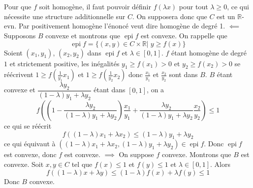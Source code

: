 \documentclass{report}
\DeclareMathOperator{\epi}{epi}
\begin{document}
\subsection{} \noindent{}\\ 
\\ 
\\
\noindent Pour que $f$ soit homogène, il faut pouvoir définir $f(\lambda x)$ pour tout $\lambda \geq 0$, ce qui nécessite une structure additionnelle sur $C$. On supposera donc que $C$ est un $\mathbb R$-evn. Par positivement homogène l'énoncé veut dire homogène de degré 1.\newline \newline
$\impliedby$ Supposons $B$ convexe et montrons que $\epi f$ est convexe. On rappelle que $$\epi f= \{(x,y)\in C\times \mathbb R|\;y\geq f(x)\}$$
Soient $(x_1,y_1)$, $(x_2,y_2)$ dans $\epi f$ et $\lambda \in [0,1]$. $f$ étant homogène de degré $1$ et strictement positive, les inégalités $y_1\geq f(x_1)>0$ et $y_2\geq f(x_2)>0$ se réécrivent $1\geq f(\frac{1}{y_1}x_1)$ et $1\geq f(\frac{1}{y_2}x_2)$ donc $\frac{x_1}{y_1}$ et $\frac{x_2}{y_2}$ sont dans $B$.\newline \newline 
$B$ étant convexe et $\dfrac{\lambda y_2}{(1-\lambda)y_1 + \lambda y_2}$ étant dans $[0,1]$, on a $$f\left(\left(1-\dfrac{\lambda y_2}{(1-\lambda)y_1 + \lambda y_2}\right)\frac{x_1}{y_1} + \dfrac{\lambda y_2}{(1-\lambda)y_1 + \lambda y_2}\frac{x_2}{y_2}\right)\leq 1$$
ce qui se réécrit $$f((1-\lambda)x_1 + \lambda x_2)\leq (1-\lambda)y_1 + \lambda y_2$$
ce qui équivaut à $((1-\lambda)x_1 + \lambda x_2,(1-\lambda)y_1 + \lambda y_2)\in \epi f$.\newline
Donc $\epi f$ est convexe, donc $f$ est convexe.\newline 
\newline 
$\implies$ On suppose $f$ convexe. Montrons que $B$ est convexe.\newline
Soit $x,y\in C$ tel que $f(x)\leq 1$ et $f(y)\leq 1$ et $\lambda \in [0,1]$. Alors $$f((1-\lambda)x+\lambda y)\leq (1-\lambda)f(x) + \lambda f(y)\leq 1$$
Donc $B$ convexe.

\subsection{} \noindent\fbox{
\parbox{\linewidth}{

}}\\ 
\\ 
\\
\noindent 
\end{document}
